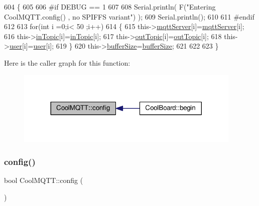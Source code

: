 \begin{DoxyCode}
604 \{
605 
606 \textcolor{preprocessor}{#if DEBUG == 1}
607 
608     Serial.println( F(\textcolor{stringliteral}{"Entering CoolMQTT.config() , no SPIFFS variant"}) );
609     Serial.println();
610 
611 \textcolor{preprocessor}{#endif}
612 
613     \textcolor{keywordflow}{for}(\textcolor{keywordtype}{int} i =0;i< 50 ;i++)
614     \{
615         this->\hyperlink{class_cool_m_q_t_t_ab8bb951f87ddbf92db74c2ad16a3e53e}{mqttServer}[i]=\hyperlink{class_cool_m_q_t_t_ab8bb951f87ddbf92db74c2ad16a3e53e}{mqttServer}[i];
616         this->\hyperlink{class_cool_m_q_t_t_a4492f52a441e83cc5151010317fdb52d}{inTopic}[i]=\hyperlink{class_cool_m_q_t_t_a4492f52a441e83cc5151010317fdb52d}{inTopic}[i];
617         this->\hyperlink{class_cool_m_q_t_t_a109c786a17b463f9eeba046194279522}{outTopic}[i]=\hyperlink{class_cool_m_q_t_t_a109c786a17b463f9eeba046194279522}{outTopic}[i];
618         this->\hyperlink{class_cool_m_q_t_t_a8cd47e45d457f908d4b4390b35aaee83}{user}[i]=\hyperlink{class_cool_m_q_t_t_a8cd47e45d457f908d4b4390b35aaee83}{user}[i];
619     \}
620     this->\hyperlink{class_cool_m_q_t_t_a7f3cf26b51d6770f216e42c5ef13ca9f}{bufferSize}=\hyperlink{class_cool_m_q_t_t_a7f3cf26b51d6770f216e42c5ef13ca9f}{bufferSize};
621     
622 
623 \}
\end{DoxyCode}
Here is the caller graph for this function\+:\nopagebreak
\begin{figure}[H]
\begin{center}
\leavevmode
\includegraphics[width=305pt]{d0/dd0/class_cool_m_q_t_t_a9b703de4f1358f0ee7a5e8c44979c648_icgraph}
\end{center}
\end{figure}
\mbox{\label{class_cool_m_q_t_t_a6571671781a505feca9a8a56e256c6bc}} 
\subsubsection{\texorpdfstring{config()}{config()}\hspace{0.1cm}{\footnotesize\ttfamily [2/2]}}
{\footnotesize\ttfamily bool Cool\+M\+Q\+T\+T\+::config (\begin{DoxyParamCaption}{ }\end{DoxyParamCaption})}

